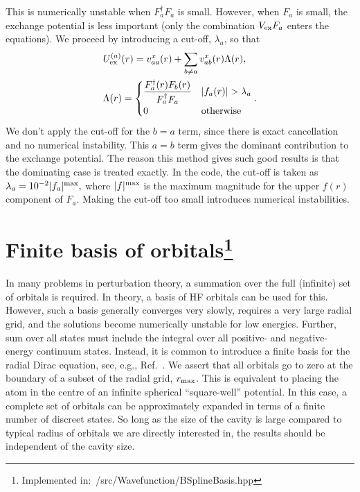 \documentclass[10pt,twocolumn,a4paper]{article}%
\newcommand{\be}{\begin{equation}}
\newcommand{\ee}{\end{equation}}
\begin{document}
This is numerically unstable when $F_a^\dag F_a$ is small.
However, when $F_a$ is small, the exchange potential is less important (only the combination $V_{\rm ex}F_a$ enters the equations).
We proceed by introducing a cut-off, $\lambda_a$, so that
%
\begin{align}
& U^{(a)}_{\rm ex}(r) =  
v^x_{aa}(r) + \sum_{b\neq a} v^x_{ab}(r) \Lambda(r),
\\
&\Lambda(r) = 
\begin{cases}\dfrac{F_a^\dag(r) F_b(r)}{F_a^\dag F_a} & |f_a(r)|>\lambda_a\\
0&\mathrm{otherwise}
\end{cases}.
\end{align}
%
We don't apply the cut-off for the $b=a$ term, since there is exact cancellation and no numerical instability.
This $a=b$ term gives the dominant contribution to the exchange potential. 
The reason this method gives such good results is that the dominating case is treated exactly.
%
In the code, the cut-off is taken as
$
\lambda_{a} = 10^{-2} |f_a|^{\rm max},
$
where  $|f|^{\rm max}$ is the maximum magnitude for the upper $f(r)$ component of $F_a$.
Making the cut-off too small introduces numerical instabilities.
%






\section[Finite basis of orbitals]{Finite basis of orbitals\label{sec:finite-basis}\footnote{Implemented in:~/src/Wavefunction/BSplineBasis.hpp}}

In many problems in perturbation theory, a summation over the full (infinite) set of orbitals is required.
In theory, a basis of HF orbitals can be used for this.
However, such a basis generally converges very slowly, requires a very large radial grid, and the solutions become numerically unstable for low energies.
Further, sum over all states must include the integral over all positive- and negative-energy continuum states.
%
Instead, it is common to introduce a finite basis for the radial Dirac equation, see, e.g., Ref.~\cite{Quiney1987,Johnson1988}.
%
We assert that all orbitals go to zero at the boundary of a subset of the radial grid, $r_{\rm max}$.
This is equivalent to placing the atom in the centre of an infinite spherical ``square-well'' potential.
In this case, a complete set of orbitals can be approximately expanded in terms of a finite number of discreet states.
So long as the size of the cavity is large compared to typical radius of orbitals we are directly interested in, the results should be independent of the cavity size.
\end{document}
